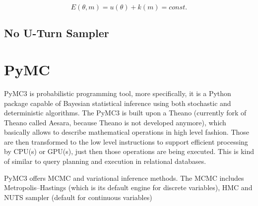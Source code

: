 \documentclass[
  digital, %
  table,   %
  twoside, %
  12pt,
  lof,     %
  lot,     %
]{fithesis3}
\begin{document}
\begin{equation}
E(\theta, m) = u(\theta) + k(m) = const.
\end{equation}


\subsection{No U-Turn Sampler}

\section{PyMC}

PyMC3 is probabilistic programming tool, more specifically, 
it is a Python package capable of Bayesian statistical 
inference using both stochastic and deterministic algorithms. 
The PyMC3 is built upon a Theano (currently fork of 
Theano called Aesara, because Theano is not developed anymore), 
which basically allows to describe mathematical operations in 
high level fashion. 
Those are then transformed to the low level instructions to 
support efficient processing by CPU(s) or GPU(s), just then 
those operations are being executed. 
This is kind of similar to query planning and execution in 
relational databases.

PyMC3 offers MCMC and variational inference methods.
The MCMC includes Metropolis–Hastings (which is its default 
engine for discrete variables), HMC and NUTS sampler (default 
for continuous variables)

\cite{blei2018}





\cite{pfeffer2016}
\cite{davidson-pilon2015}


\printbibliography
\end{document}
